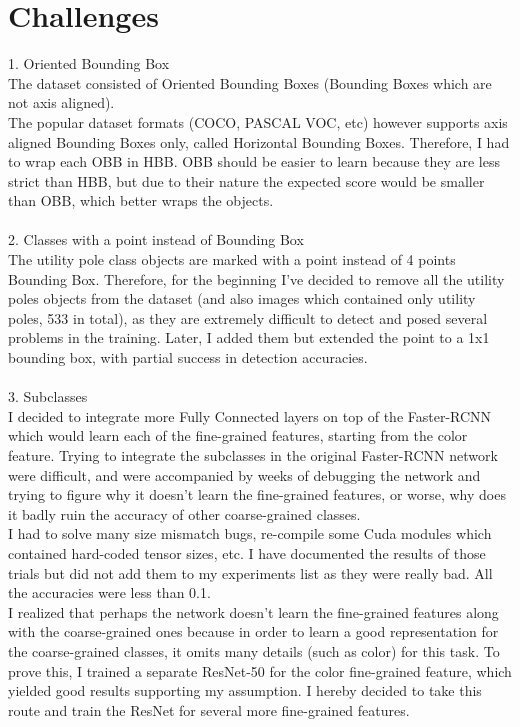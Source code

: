 \documentclass[]{article}
\begin{document}
\section{Challenges}
1. Oriented Bounding Box \\
The dataset consisted of Oriented Bounding Boxes (Bounding Boxes which are not axis aligned). \\
The popular dataset formats (COCO, PASCAL VOC, etc) however supports axis aligned Bounding Boxes only, called Horizontal Bounding Boxes. 
Therefore, I had to wrap each OBB in HBB.  
OBB should be easier to learn because they are less strict than HBB, but due to their nature the expected score would be smaller than OBB, which better wraps the objects.
\\\\
2. Classes with a point instead of Bounding Box\\
The utility pole class objects are marked with a point instead of 4 points Bounding Box. Therefore, for the beginning I've decided to remove all the utility poles objects from the dataset (and also images which contained only utility poles, 533 in total), as they are extremely difficult to detect and posed several problems in the training. Later, I added them but extended the point to a 1x1 bounding box, with partial success in detection accuracies.
\\\\
3. Subclasses\\
I decided to integrate more Fully Connected layers on top of the Faster-RCNN which would learn each of the fine-grained features, starting from the color feature.
Trying to integrate the subclasses in the original Faster-RCNN network were difficult, and were accompanied by weeks of debugging the network and trying to figure why it doesn't learn the fine-grained features, or worse, why does it badly ruin the accuracy of other coarse-grained classes.\\
I had to solve many size mismatch bugs, re-compile some Cuda modules which contained hard-coded tensor sizes, etc.
I have documented the results of those trials but did not add them to my experiments list as they were really bad. All the accuracies were less than 0.1.\\
I realized that perhaps the network doesn't learn the fine-grained features along with the coarse-grained ones because in order to learn a good representation for the coarse-grained classes, it omits many details (such as color) for this task. To prove this, I trained a separate ResNet-50 for the color fine-grained feature, which yielded good results supporting my assumption. I hereby decided to take this route and train the ResNet for several more fine-grained features.
\end{document}
